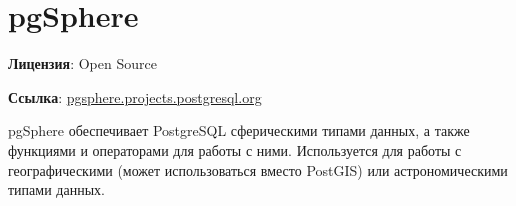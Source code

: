 \section{pgSphere}
\textbf{Лицензия}: Open Source

\textbf{Ссылка}: \href{http://pgsphere.projects.postgresql.org/}{pgsphere.projects.postgresql.org}

pgSphere обеспечивает PostgreSQL сферическими типами данных, а также функциями и операторами для работы с ними. Используется для работы с географическими (может использоваться вместо PostGIS) или астрономическими типами данных.